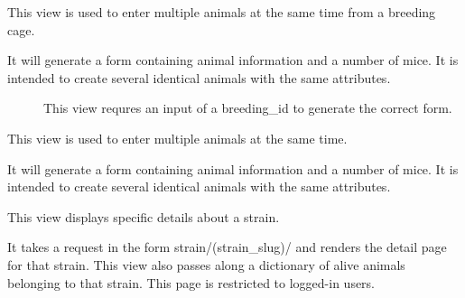 \documentclass[letterpaper,10pt,english]{sphinxmanual}
\begin{document}

\begin{fulllineitems}
\label{api:mousedb.animal.views.multiple_breeding_pups}
This view is used to enter multiple animals at the same time from a breeding cage.
\begin{description}
\item[{It will generate a form containing animal information and a number of mice.  It is intended to create several identical animals with the same attributes.}] \leavevmode
This view requres an input of a breeding\_id to generate the correct form.

\end{description}

\end{fulllineitems}



\begin{fulllineitems}
\label{api:mousedb.animal.views.multiple_pups}
This view is used to enter multiple animals at the same time.

It will generate a form containing animal information and a number of mice.  It is intended to create several identical animals with the same attributes.

\end{fulllineitems}



\begin{fulllineitems}
\label{api:mousedb.animal.views.strain_detail}
This view displays specific details about a strain.

It takes a request in the form strain/(strain\_slug)/ and renders the detail page for that strain.
This view also passes along a dictionary of alive animals belonging to that strain.
This page is restricted to logged-in users.

\end{fulllineitems}


\end{document}
